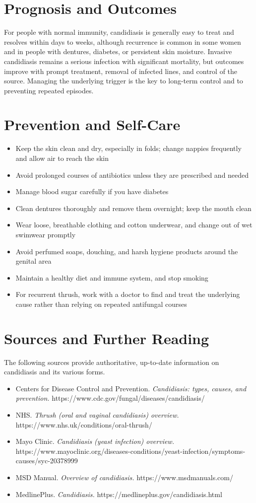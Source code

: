 \section*{Prognosis and Outcomes}
For people with normal immunity, candidiasis is generally easy to treat and resolves within days to weeks, although recurrence is common in some women and in people with dentures, diabetes, or persistent skin moisture. Invasive candidiasis remains a serious infection with significant mortality, but outcomes improve with prompt treatment, removal of infected lines, and control of the source. Managing the underlying trigger is the key to long-term control and to preventing repeated episodes.

\section*{Prevention and Self-Care}
\begin{itemize}
    \item Keep the skin clean and dry, especially in folds; change nappies frequently and allow air to reach the skin
    \item Avoid prolonged courses of antibiotics unless they are prescribed and needed
    \item Manage blood sugar carefully if you have diabetes
    \item Clean dentures thoroughly and remove them overnight; keep the mouth clean
    \item Wear loose, breathable clothing and cotton underwear, and change out of wet swimwear promptly
    \item Avoid perfumed soaps, douching, and harsh hygiene products around the genital area
    \item Maintain a healthy diet and immune system, and stop smoking
    \item For recurrent thrush, work with a doctor to find and treat the underlying cause rather than relying on repeated antifungal courses
\end{itemize}

\section*{Sources and Further Reading}
The following sources provide authoritative, up-to-date information on candidiasis and its various forms.
\begin{itemize}
    \item Centers for Disease Control and Prevention. \textit{Candidiasis: types, causes, and prevention.} https://www.cdc.gov/fungal/diseases/candidiasis/
    \item NHS. \textit{Thrush (oral and vaginal candidiasis) overview.} https://www.nhs.uk/conditions/oral-thrush/
    \item Mayo Clinic. \textit{Candidiasis (yeast infection) overview.} https://www.mayoclinic.org/diseases-conditions/yeast-infection/symptoms-causes/syc-20378999
    \item MSD Manual. \textit{Overview of candidiasis.} https://www.msdmanuals.com/
    \item MedlinePlus. \textit{Candidiasis.} https://medlineplus.gov/candidiasis.html
\end{itemize}
